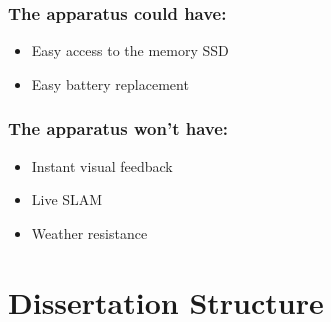 \subsubsection*{The apparatus could have:}
\begin{itemize}
    \item Easy access to the memory SSD
    \item Easy battery replacement
\end{itemize}

\subsubsection*{The apparatus won't have:}
\begin{itemize}
    \item Instant visual feedback
    \item Live \acl*{SLAM}
    \item Weather resistance
\end{itemize}


\section{Dissertation Structure}